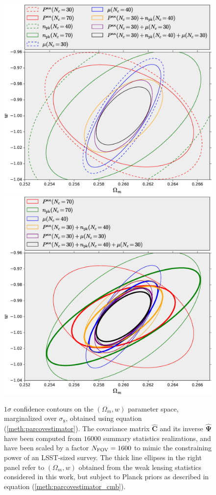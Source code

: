 \documentclass[reprint,aps,prd,superscriptaddress,showkeys,showpacs]{revtex4-1}
\newcommand{\bbh}[1]{\mathbf{\hat{#1}}}
\begin{document}
\begin{figure}
\includegraphics[scale=0.3]{Figures/constraints_Om-w_lensing.eps}
\includegraphics[scale=0.3]{Figures/constraints_Om-w_lensing_cmb.eps}
\caption{$1\sigma$ confidence contours on the $(\Omega_m,w)$ parameter space, marginalized over $\sigma_8$, obtained using equation (\ref{meth:parcovestimator}). The covariance matrix $\bbh{C}$ and its inverse $\bbh{\Psi}$ have been computed from $16000$ summary statistics realizations, and have been scaled by a factor $N_{\rm FOV}=1600$ to mimic the constraining power of an LSST-sized survey. The thick line ellipses in the right panel refer to $(\Omega_m,w)$ obtained from the weak lensing statistics considered in this work, but subject to Planck priors as described in equation (\ref{meth:parcovestimator_cmb}).}
\label{fig:constraintsOm-w}
\end{figure}
\end{document}
